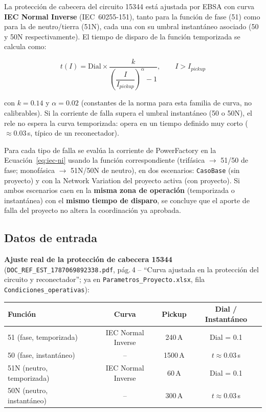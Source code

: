 \documentclass[11pt,a4paper]{article}
\begin{document}
La protecci\'on de cabecera del circuito 15344 est\'a ajustada por EBSA con curva \textbf{IEC Normal Inverse} (IEC~60255-151), tanto para la funci\'on de fase (51) como para la de neutro/tierra (51N), cada una con su umbral instant\'aneo asociado (50 y 50N respectivamente). El tiempo de disparo de la funci\'on temporizada se calcula como:

\begin{equation}
t(I) = \text{Dial} \times \dfrac{k}{\left(\dfrac{I}{I_{pickup}}\right)^{\alpha} - 1}, \qquad I > I_{pickup}
\label{eq:iec-ni}
\end{equation}

con $k = 0.14$ y $\alpha = 0.02$ (constantes de la norma para esta familia de curva, no calibrables). Si la corriente de falla supera el umbral instant\'aneo (50 o 50N), el rele no espera la curva temporizada: opera en un tiempo definido muy corto ($\approx 0.03$\,s, t\'ipico de un reconectador).

Para cada tipo de falla se eval\'ua la corriente de PowerFactory en la Ecuaci\'on~\ref{eq:iec-ni} usando la funci\'on correspondiente (trif\'asica $\rightarrow$ 51/50 de fase; monof\'asica $\rightarrow$ 51N/50N de neutro), en dos escenarios: \texttt{CasoBase} (sin proyecto) y con la Network Variation del proyecto activa (con proyecto). Si ambos escenarios caen en la \textbf{misma zona de operaci\'on} (temporizada o instant\'anea) con el \textbf{mismo tiempo de disparo}, se concluye que el aporte de falla del proyecto no altera la coordinaci\'on ya aprobada.

\subsection{Datos de entrada}

\textbf{Ajuste real de la protecci\'on de cabecera 15344} (\texttt{DOC\_REF\_EST\_1787069892338.pdf}, p\'ag.\,4 -- ``Curva ajustada en la protecci\'on del circuito y reconectador''; ya en \texttt{Parametros\_Proyecto.xlsx}, fila \texttt{Condiciones\_operativas}):

\begin{center}
\begin{tabular}{|l|c|c|c|}
\hline
\textbf{Funci\'on} & \textbf{Curva} & \textbf{Pickup} & \textbf{Dial / Instant\'aneo} \\ \hline
51 (fase, temporizada) & IEC Normal Inverse & 240\,A & Dial = 0.1 \\ \hline
50 (fase, instant\'aneo) & -- & 1500\,A & $t \approx 0.03$\,s \\ \hline
51N (neutro, temporizada) & IEC Normal Inverse & 60\,A & Dial = 0.1 \\ \hline
50N (neutro, instant\'aneo) & -- & 300\,A & $t \approx 0.03$\,s \\ \hline
\end{tabular}
\end{center}
\end{document}

